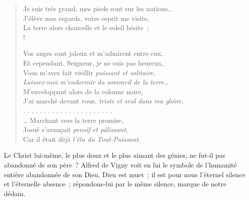 \documentclass[french,twoside]{book} %
\begin{document}
\begin{verse}
Je suis très grand, mes pieds sont sur les nations…\\
J’élève mes regards, votre esprit me visite,\\
La terre alors chancelle et le soleil hésite ;\\!

Vos anges sont jaloux et m’admirent entre eux.\\
Et cependant, Seigneur, je ne suis pas heureux,\\
Vous m’avez fait vieillir \emph{puissant et solitaire.}\\
\emph{Laissez-moi m’endormir du sommeil de la terre…}\\
M’enveloppant alors de la colonne noire,\\
J’ai marché devant vous, \emph{triste et seul dans ma gloire.}\\
. . . . . . . . . . . . . . . . . . . . . .\\
… Marchant vers la terre promise,\\
Josué s’avançait \emph{pensif et pâlissant},\\
Car il était déjà \emph{l’élu du Tout-Puissant}.\\
\end{verse}

\noindent Le Christ lui-même, le plus doux et le plus aimant des génies, ne fut-il pas abandonné de son père ? Alfred de Vigny voit en lui le symbole de l’humanité entière abandonnée de son Dieu. Dieu est muet ; il est pour nous l’éternel silence et l’éternelle absence ; répondons-lui par le même silence, marque de notre dédain.\par
\end{document}
